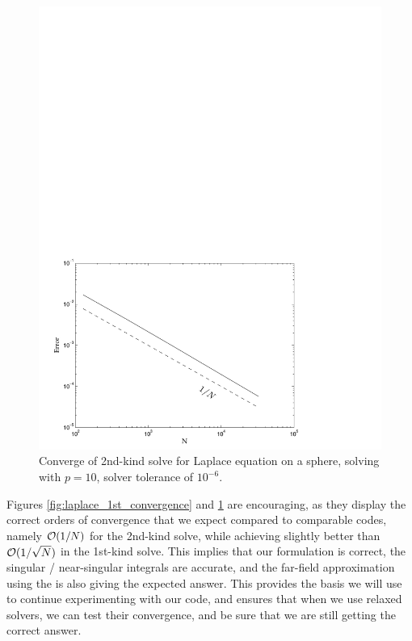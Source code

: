 \begin{figure}[h]
\begin{center}
	\includegraphics[width=14cm]{img/SecondKindConvergence.pdf}
	\caption{Converge of 2nd-kind solve for Laplace equation on a sphere, solving with $p=10$, solver tolerance of $10^{-6}$.}
	\label{fig:laplace_2nd_convergence}
\end{center}
\end{figure}

Figures \ref{fig:laplace_1st_convergence} and \ref{fig:laplace_2nd_convergence} are encouraging, as they display the correct orders of convergence that we expect compared to comparable codes, namely $\mathcal{O}(1/N)$ for the 2nd-kind solve, while achieving slightly better than $\mathcal{O}(1/\sqrt{N})$ in the 1st-kind solve. This implies that our {\bem} formulation is correct, the singular / near-singular integrals are accurate, and the far-field approximation using the {\fmm} is also giving the expected answer. This provides the basis we will use to continue experimenting with our code, and ensures that when we use relaxed solvers, we can test their convergence, and be sure that we are still getting the correct answer.

